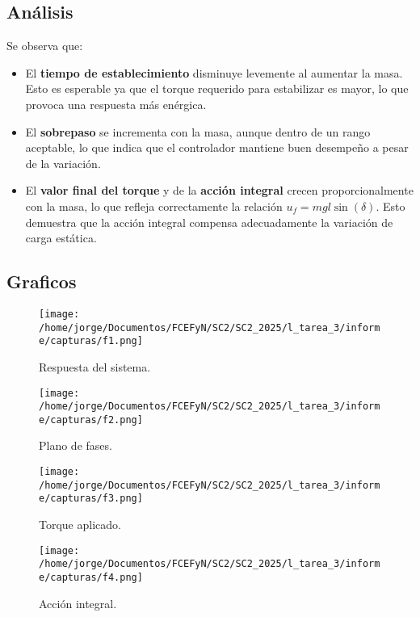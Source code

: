 \documentclass[11pt]{article}
\begin{document}
\subsection*{Análisis}

Se observa que:

\begin{itemize}
  \item El \textbf{tiempo de establecimiento} disminuye levemente al aumentar la masa. Esto es esperable ya que el torque requerido para estabilizar es mayor, lo que provoca una respuesta más enérgica.
  \item El \textbf{sobrepaso} se incrementa con la masa, aunque dentro de un rango aceptable, lo que indica que el controlador mantiene buen desempeño a pesar de la variación.
  \item El \textbf{valor final del torque} y de la \textbf{acción integral} crecen proporcionalmente con la masa, lo que refleja correctamente la relación \( u_f = mgl \sin(\delta) \). Esto demuestra que la acción integral compensa adecuadamente la variación de carga estática.
\end{itemize}

\newpage

\subsection*{Graficos}

 \begin{figure}[ht]
          \centering
            \texttt{[image: /home/jorge/Documentos/FCEFyN/SC2/SC2\_2025/l\_tarea\_3/informe/capturas/f1.png]}
              \caption{Respuesta del sistema.}
            \end{figure} 


    \begin{figure}[ht]
          \centering
            \texttt{[image: /home/jorge/Documentos/FCEFyN/SC2/SC2\_2025/l\_tarea\_3/informe/capturas/f2.png]}
              \caption{Plano de fases.}
            \end{figure} 
\newpage

    \begin{figure}[ht]
          \centering
            \texttt{[image: /home/jorge/Documentos/FCEFyN/SC2/SC2\_2025/l\_tarea\_3/informe/capturas/f3.png]}
              \caption{Torque aplicado.}
            \end{figure} 


    \begin{figure}[ht]
          \centering
            \texttt{[image: /home/jorge/Documentos/FCEFyN/SC2/SC2\_2025/l\_tarea\_3/informe/capturas/f4.png]}
              \caption{Acción integral.}
            \end{figure} 
\end{document}
